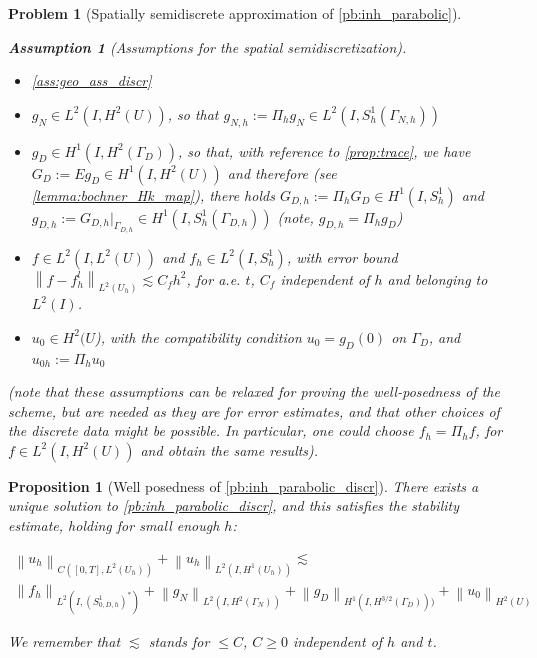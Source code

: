 \documentclass[english,a4paper,10pt,oneside]{scrbook}	%
\theoremstyle{break}
\newtheorem{prop}[equation]{Proposition}
\newtheorem{ass}[equation]{Assumption}
\newtheorem{pb}[equation]{Problem}
\theoremstyle{remark}
\newcommand{\norm}[1]{\left\lVert#1\right\rVert}
\begin{document}
\begin{appendices}
\begin{pb}[Spatially semidiscrete approximation of \cref{pb:inh_parabolic}]
\begin{ass}[Assumptions for the spatial semidiscretization]
\label{ass:discr_reg}
\textcolor{white}{ }
\begin{itemize}
	\item \cref{ass:geo_ass_discr}
	\item $g_N \in L^2(I,H^2(U))$, so that $g_{N,h}:=\Pi_h g_N \in L^2(I, S^1_h(\Gamma_{N,h}))$
	\item $g_D \in H^1(I, H^{2}(\Gamma_D))$, so that, with reference to \cref{prop:trace}, we have $G_D:=Eg_D \in H^1(I,H^2(U))$ and therefore (see \cref{lemma:bochner_Hk_map}), there holds $G_{D,h}:=\Pi_h G_D \in H^1(I, S^1_h)$ and $g_{D,h}:=G_{D,h}|_{\Gamma_{D,h}} \in H^1(I, S^1_h(\Gamma_{D,h}))$ (note, $g_{D,h} = \Pi_h g_D$)
	\item $f \in L^2(I,L^2(U))$ and $f_h \in L^2(I, S^1_h)$, with error bound  $\norm{f-f_h^l}_{L^2(U_h)}\lesssim C_f h^2$, for a.e. $t$, $C_f$ independent of $h$ and belonging to $L^2(I)$.
	\item $u_0\in H^2(U$), with the compatibility condition $u_{0} = g_{D}(0)$ on $\Gamma_{D}$, and $u_{0h}:=\Pi_h u_0$
\end{itemize}

(note that these assumptions can be relaxed for proving the well-posedness of the scheme, but are needed as they are for error estimates, and that other choices of the discrete data might be possible. In particular, one could choose $f_h=\Pi_h f$, for $f\in L^2(I, H^2(U))$ and obtain the same results).

\end{ass}

\end{pb}

\begin{prop}[Well posedness of \cref{pb:inh_parabolic_discr}]
\label{prop:wp_discr_par}
There exists a unique solution to \cref{pb:inh_parabolic_discr}, and this satisfies the stability estimate, holding for small enough $h$:

\begin{align*}
	\norm{u_h}_{C([0,T],L^2(U_h))} + \norm{u_h}_{L^2(I,H^1(U_h))}\lesssim \\\norm{f_h}_{L^2(I,(S^1_{0,D,h})^*)}  + \norm{g_{N}}_{L^2(I,H^2(\Gamma_{N}))} + \norm{g_D}_{H^1(I,H^{3/2}(\Gamma_D)))} + \norm{u_{0}}_{H^2(U)}
\end{align*}

We remember that $\lesssim$ stands for $\leq C$, $C\geq 0$ independent of $h$ and $t$.


\end{prop}
\end{appendices}
\end{document}
